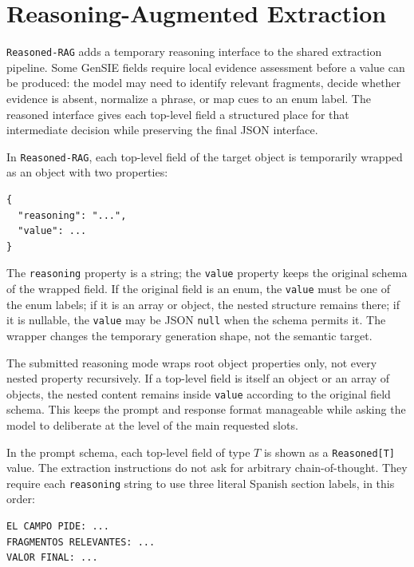 \section{Reasoning-Augmented Extraction}
\label{sec:reasoning-augmented-extraction}

\texttt{Reasoned-RAG} adds a temporary reasoning interface to the shared extraction pipeline. Some GenSIE fields require local evidence assessment before a value can be produced: the model may need to identify relevant fragments, decide whether evidence is absent, normalize a phrase, or map cues to an enum label. The reasoned interface gives each top-level field a structured place for that intermediate decision while preserving the final JSON interface.

In \texttt{Reasoned-RAG}, each top-level field of the target object is temporarily wrapped as an object with two properties:

\begin{verbatim}
{
  "reasoning": "...",
  "value": ...
}
\end{verbatim}

The \texttt{reasoning} property is a string; the \texttt{value} property keeps the original schema of the wrapped field. If the original field is an enum, the \texttt{value} must be one of the enum labels; if it is an array or object, the nested structure remains there; if it is nullable, the \texttt{value} may be JSON \texttt{null} when the schema permits it. The wrapper changes the temporary generation shape, not the semantic target.

The submitted reasoning mode wraps root object properties only, not every nested property recursively. If a top-level field is itself an object or an array of objects, the nested content remains inside \texttt{value} according to the original field schema. This keeps the prompt and response format manageable while asking the model to deliberate at the level of the main requested slots.

In the prompt schema, each top-level field of type \(T\) is shown as a \texttt{Reasoned[T]} value. The extraction instructions do not ask for arbitrary chain-of-thought. They require each \texttt{reasoning} string to use three literal Spanish section labels, in this order:

\begin{verbatim}
EL CAMPO PIDE: ...
FRAGMENTOS RELEVANTES: ...
VALOR FINAL: ...
\end{verbatim}

